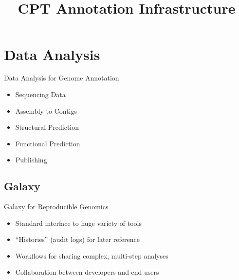 \documentclass[12pt]{phage3slides} %
\title[CPT Annotation Infrastructure]{CPT Annotation Infrastructure}
\begin{document}
\frame{\titlepage}

\section{Data Analysis}
\begin{frame}{Data Analysis for Genome Annotation}
	\begin{itemize}
		\item Sequencing Data
		\item Assembly to Contigs
		\item Structural Prediction
		\item Functional Prediction
		\item Publishing
	\end{itemize}
\end{frame}


\subsection{Galaxy}
\begin{frame}{Galaxy for Reproducible Genomics}
	\begin{itemize}
		\item Standard interface to huge variety of tools
		\item ``Histories'' (audit logs) for later reference
		\item Workflows for sharing complex, multi-step analyses
		\item Collaboration between developers and end users
	\end{itemize}
\end{frame}

{%
  \begin{frame}[plain]
  \end{frame}
}
\end{document}
